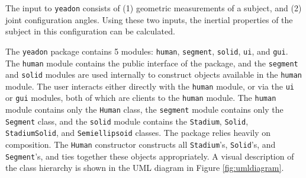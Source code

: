 \documentclass[10pt,a4paper,twocolumn]{article}
\begin{document}
The input to \verb+yeadon+ consists of (1) geometric measurements of a subject,
and (2) joint configuration angles. Using these two inputs, the inertial
properties of the subject in this configuration can be calculated.

The \verb+yeadon+ package contains 5 modules: \verb+human+, \verb+segment+,
\verb+solid+, \verb+ui+, and \verb+gui+. The \verb+human+ module contains the
public interface of the package, and the \verb+segment+ and \verb+solid+
modules are used internally to construct objects available in the \verb+human+
module. The user interacts either directly with the \verb+human+ module, or via
the \verb+ui+ or \verb+gui+ modules, both of which are clients to the
\verb+human+ module. The \verb+human+ module contains only the \verb+Human+
class, the \verb+segment+ module contains only the \verb+Segment+ class, and
the \verb+solid+ module contains the \verb+Stadium+, \verb+Solid+,
\verb+StadiumSolid+, and \verb+Semiellipsoid+ classes. The package relies
heavily on composition. The \verb+Human+ constructor constructs all
\verb+Stadium+'s, \verb+Solid+'s, and \verb+Segment+'s, and ties together these
objects appropriately. A visual description of the class hierarchy is shown in
the UML diagram in Figure \ref{fig:umldiagram}.
\end{document}
